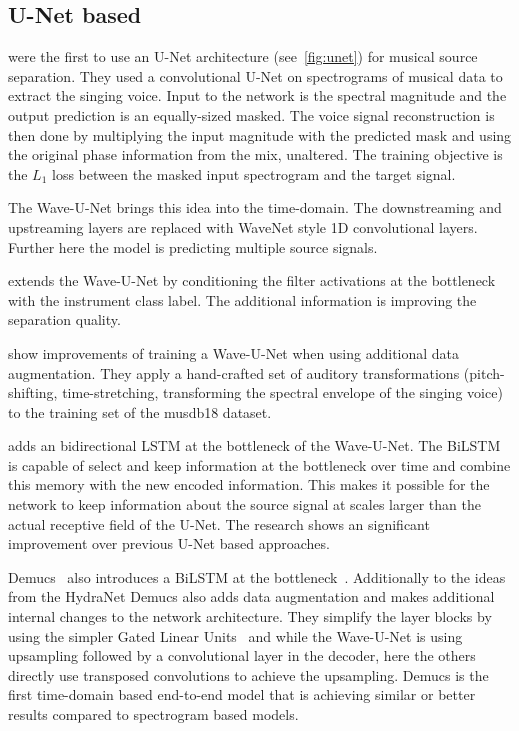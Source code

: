 \subsection{U-Net based}

\textcite{janssonSinging2017} were the first to use an U-Net architecture (see~\cref{fig:unet}) for musical source separation. They used a convolutional U-Net on spectrograms of musical data to extract the singing voice. Input to the network is the spectral magnitude and the output prediction is an equally-sized masked. The voice signal reconstruction is then done by multiplying the input magnitude with the predicted mask and using the original phase information from the mix, unaltered. The training objective is the \(L_1\) loss between the masked input spectrogram and the target signal.

The Wave-U-Net\cite{stollerWaveUNet2018} brings this idea into the time-domain. The downstreaming and upstreaming layers are replaced with WaveNet style 1D convolutional layers. Further here the model is predicting multiple source signals.

\textcite{slizovskaiaEndtoEnd2019} extends the Wave-U-Net by conditioning the filter activations at the bottleneck with the instrument class label. The additional information is improving the separation quality.

\textcite{cohen-hadriaImproving2019} show improvements of training a Wave-U-Net when using additional data augmentation. They apply a hand-crafted set of auditory transformations (pitch-shifting, time-stretching, transforming the spectral envelope of the singing voice) to the training set of the musdb18 dataset.

\textcite{kaspersenHydraNet2019} adds an bidirectional LSTM at the bottleneck of the Wave-U-Net. The BiLSTM is capable of select and keep information at the bottleneck over time and combine this memory with the new encoded information. This makes it possible for the network to keep information about the source signal at scales larger than the actual receptive field of the U-Net. The research shows an significant improvement over previous U-Net based approaches.

\cite{narayanaswamyAudio2019}

Demucs~\cite{defossezDemucs2019} also introduces a BiLSTM at the bottleneck~\cite{defossezSING2018}. Additionally to the ideas from the HydraNet Demucs also adds data augmentation and makes additional internal changes to the network architecture. They simplify the layer blocks by using the simpler Gated Linear Units~\cite{dauphinLanguage2017} and while the Wave-U-Net is using upsampling followed by a convolutional layer in the decoder, here the others directly use transposed convolutions to achieve the upsampling. Demucs is the first time-domain based end-to-end model that is achieving similar or better results compared to spectrogram based models.

